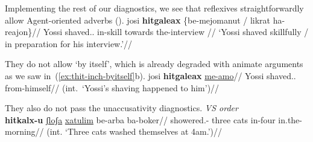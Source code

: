 
%
%
%

Implementing the rest of our diagnostics, we see that reflexives straightforwardly allow Agent-oriented adverbs (\nextx).
\ex
	\begingl
		\gla josi \textbf{hitgaleax} \{be-mejomanut / likrat ha-reajon\}//
		\glb Yossi shaved.. in-skill {} towards the-interview //
		\glft `Yossi shaved skillfully / in preparation for his interview.'//
	\endgl
\xe

They do not allow `by itself', which is already degraded with animate arguments as we saw in~(\ref{ex:thit-inch-byitself}b).
\ex \ljudge{*}
	\begingl
		\gla josi \textbf{hitgaleax} \underline{me-a{\ts}mo}//
		\glb Yossi shaved.. from-himself//
		\glft (int.~`Yossi's shaving happened to him')//
	\endgl
\xe

They also do not pass the unaccusativity diagnostics.
\ex \textit{VS order}\\
	\begingl
	\gla \ljudge{\#}\textbf{hitkalx-u} \underline{ʃloʃa} \underline{xatulim} be-arba ba-boker//
	\glb showered.- three cats in-four in.the-morning//
	\glft (int. `Three cats washed themselves at 4am.')//
	\endgl
\xe

